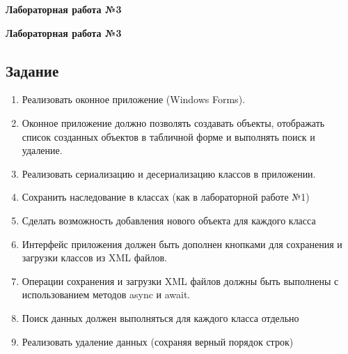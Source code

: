 \documentclass[12pt]{article}
\newcommand{\lablogo}
{
\begin{center}
    \huge{\textbf{Лабораторная работа №3}} \\
\end{center}
}
\numberwithin{listing}{section}
\numberwithin{figure}{section}
\begin{document}
\pagestyle{empty}
\lablogo
\tableofcontents
\renewcommand\listoflistingscaption{Листинг}
\listoflistings

\newpage
\pagestyle{fancy}
\lablogo
\begin{center}
	\section
	 [Задание \ \texorpdfstring{\faScroll}{}]
	 {Задание \ \texorpdfstring{\faScroll}{}\protect\footnotemark}
\end{center}
\begin{enumerate}
	\item Реализовать оконное приложение (Windows Forms).
	\item Оконное приложение должно позволять создавать объекты, отображать список созданных объектов в табличной форме и выполнять поиск и удаление.
	\item Реализовать сериализацию и десериализацию классов в приложении.
	\item Сохранить наследование в классах (как в лабораторной работе №1)
	\item Сделать возможность добавления нового объекта для каждого класса
	\item Интерфейс приложения должен быть дополнен кнопками для сохранения и загрузки классов из XML файлов.
	\item Операции сохранения и загрузки XML файлов должны быть выполнены с использованием методов async и await.
	\item Поиск данных должен выполняться для каждого класса отдельно
	\item Реализовать удаление данных (сохраняя верный порядок строк)
\end{enumerate}

\end{document}
